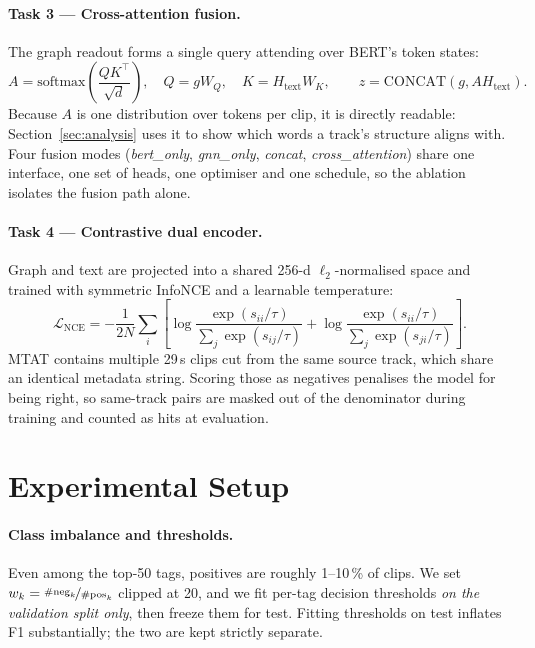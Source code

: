 \documentclass{article}
\begin{document}
\paragraph{Task 3 --- Cross-attention fusion.} The graph readout forms a single
query attending over BERT's token states:
\begin{equation}
A = \mathrm{softmax}\!\left( \frac{QK^{\top}}{\sqrt{d}} \right), \quad Q = gW_Q, \quad K = H_{\text{text}}W_K,
\qquad z = \mathrm{CONCAT}(g, A H_{\text{text}}).
\end{equation}
Because $A$ is one distribution over tokens per clip, it is directly readable:
Section~\ref{sec:analysis} uses it to show which words a track's structure
aligns with. Four fusion modes (\textit{bert\_only}, \textit{gnn\_only},
\textit{concat}, \textit{cross\_attention}) share one interface, one set of
heads, one optimiser and one schedule, so the ablation isolates the fusion path
alone.

\paragraph{Task 4 --- Contrastive dual encoder.} Graph and text are projected
into a shared 256-d $\ell_2$-normalised space and trained with symmetric InfoNCE
and a learnable temperature:
\begin{equation}
\mathcal{L}_{\text{NCE}} = -\frac{1}{2N}\sum_i \left[ \log \frac{\exp(s_{ii}/\tau)}{\sum_j \exp(s_{ij}/\tau)} + \log \frac{\exp(s_{ii}/\tau)}{\sum_j \exp(s_{ji}/\tau)} \right].
\end{equation}
MTAT contains multiple 29\,s clips cut from the same source track, which share an
identical metadata string. Scoring those as negatives penalises the model for
being right, so same-track pairs are masked out of the denominator during
training and counted as hits at evaluation.

\section{Experimental Setup}
\label{sec:setup}

\paragraph{Class imbalance and thresholds.} Even among the top-50 tags,
positives are roughly 1--10\,\% of clips. We set
$w_k = \nicefrac{\#\text{neg}_k}{\#\text{pos}_k}$ clipped at 20, and we fit
per-tag decision thresholds \emph{on the validation split only}, then freeze them
for test. Fitting thresholds on test inflates F1 substantially; the two are kept
strictly separate.
\end{document}
